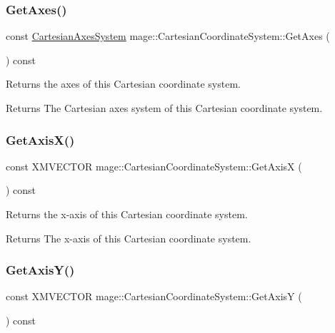 \subsubsection{\texorpdfstring{Get\+Axes()}{GetAxes()}}
{\footnotesize\ttfamily const \hyperlink{structmage_1_1_cartesian_axes_system}{Cartesian\+Axes\+System} mage\+::\+Cartesian\+Coordinate\+System\+::\+Get\+Axes (\begin{DoxyParamCaption}{ }\end{DoxyParamCaption}) const\hspace{0.3cm}{\ttfamily [noexcept]}}

Returns the axes of this Cartesian coordinate system.

\begin{DoxyReturn}{Returns}
The Cartesian axes system of this Cartesian coordinate system. 
\end{DoxyReturn}
\hypertarget{structmage_1_1_cartesian_coordinate_system_a00947f77f6af53596d00ee76e0486430}{}\label{structmage_1_1_cartesian_coordinate_system_a00947f77f6af53596d00ee76e0486430} 
\subsubsection{\texorpdfstring{Get\+Axis\+X()}{GetAxisX()}}
{\footnotesize\ttfamily const X\+M\+V\+E\+C\+T\+OR mage\+::\+Cartesian\+Coordinate\+System\+::\+Get\+AxisX (\begin{DoxyParamCaption}{ }\end{DoxyParamCaption}) const\hspace{0.3cm}{\ttfamily [noexcept]}}

Returns the x-\/axis of this Cartesian coordinate system.

\begin{DoxyReturn}{Returns}
The x-\/axis of this Cartesian coordinate system. 
\end{DoxyReturn}
\hypertarget{structmage_1_1_cartesian_coordinate_system_a5e625320f8d7c3b0c46fe89c51d9e8ec}{}\label{structmage_1_1_cartesian_coordinate_system_a5e625320f8d7c3b0c46fe89c51d9e8ec} 
\subsubsection{\texorpdfstring{Get\+Axis\+Y()}{GetAxisY()}}
{\footnotesize\ttfamily const X\+M\+V\+E\+C\+T\+OR mage\+::\+Cartesian\+Coordinate\+System\+::\+Get\+AxisY (\begin{DoxyParamCaption}{ }\end{DoxyParamCaption}) const\hspace{0.3cm}{\ttfamily [noexcept]}}

